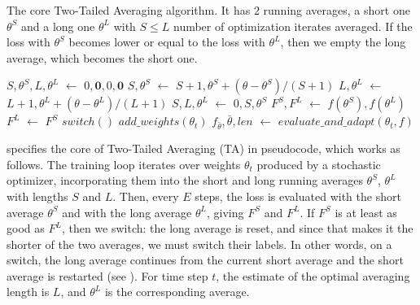 \documentclass[twocolumn]{article}
\newcommand*\Let[2]{\State #1 $\gets$ #2}
\newcommand{\tta}{\textlf{2}TA}
\begin{document}
\begin{algorithm}[t]
  \caption[The core Two-Tailed Averaging algorithm, without extensions.]{\small The core Two-Tailed Averaging algorithm.
It has 2 running averages, a short one $\theta^S$ and a long one $\theta^L$ with $S \leq L$ number of optimization iterates averaged.
If the loss with $\theta^S$ becomes lower or equal to the loss with $\theta^L$, then we empty the long average, which becomes the short one.}
  \label{alg:two-tailed-averaging-core}
  \begin{algorithmic}[1]
    \Let{$S,\theta^S, L, \theta^L$} {$0, \mathbf{0}, 0, \mathbf{0}$}
    \State
      \Let{$S, \theta^S$}{$S+1,\theta^S + (\theta-\theta^S)/(S+1)$}
      \Let{$L, \theta^L$}{$L+1,\theta^L + (\theta-\theta^L)/(L+1)$}
    \EndProcedure
    \State
      \Let{$S, L,\theta^L$}{$0,S,\theta^S$}
    \EndProcedure
    \State
      \Let{$F^S,F^L$}{$f(\theta^S),f(\theta^L)$}
        \Let{$F^L$}{$F^S$}
        \State $switch()$
        \label{algo:line:switch}
      \EndIf
      \State {}
    \EndFunction
    \State
      \State $add\_weights(\theta_t)$
      \label{algo:line:beforeswitch}
        \Let{$f_{\bar{\theta}}, \bar{\theta}, len$}{$evaluate\_and\_adapt(\theta_t, f)$}
      \EndIf
    \EndFor
  \end{algorithmic}
\end{algorithm}

 specifies the core of Two-Tailed Averaging (\tta{}) in pseudocode, which works as follows.
The training loop iterates over weights $\theta_t$ produced by a stochastic optimizer, incorporating them into the short and long running averages $\theta^S$, $\theta^L$ with lengths $S$ and $L$.
Then, every $E$ steps, the loss is evaluated with the short average $\theta^S$ and with the long average $\theta^L$, giving $F^S$ and $F^L$.
If $F^S$ is at least as good as $F^L$, then we switch: the long average is reset,
and since that makes it the shorter of the two averages, we must switch their labels.
In other words, on a switch, the long average continues from the current short average and the short average is restarted (see ).
For time step $t$, the estimate of the optimal averaging length is $L$, and $\theta^L$ is the corresponding average.
\end{document}
